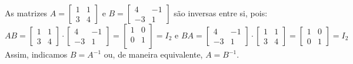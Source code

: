\begin{example}
	As matrizes $A = \begin{bmatrix}
			1 & 1 \\
			3 & 4
		\end{bmatrix}$ e $B = \begin{bmatrix}
			4  & -1 \\
			-3 & 1
		\end{bmatrix}$ são inversas entre si, pois:
	\begin{equation*}
		AB = \begin{bmatrix}
			1 & 1 \\
			3 & 4
		\end{bmatrix} \cdot \begin{bmatrix}
			4  & -1 \\
			-3 & 1
		\end{bmatrix} = \begin{bmatrix}
			1 & 0 \\
			0 & 1 \\
		\end{bmatrix} = I_2 \text{  e  } BA = \begin{bmatrix}
			4  & -1 \\
			-3 & 1
		\end{bmatrix} \cdot \begin{bmatrix}
			1 & 1 \\
			3 & 4
		\end{bmatrix} = \begin{bmatrix}
			1 & 0 \\
			0 & 1
		\end{bmatrix} = I_2
	\end{equation*}
	Assim, indicamos $B = A^{-1}$ ou, de maneira equivalente, $A = B^{-1}$.
\end{example}

